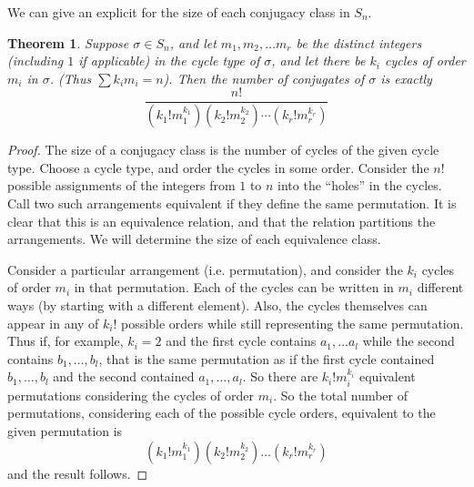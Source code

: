 \documentclass[12pt]{article}
\newtheorem{thm}{Theorem}
\theoremstyle{definition}
\begin{document}
We can give an explicit  for the size of each conjugacy class in $S_n$. 
\begin{thm}
Suppose $\sigma\in S_n$, and let $m_1,m_2,\ldots m_r$ be the \emph{distinct} integers (including $1$ if applicable) in the cycle type of $\sigma$, and let there be $k_i$ cycles of order $m_i$ in $\sigma$. (Thus $\sum k_i m_i=n$). Then the number of conjugates of $\sigma$ is exactly
\[\frac{n!}{(k_1!m_1^{k_1})(k_2!m_2^{k_2})\cdots(k_r!m_r^{k_r})}\]
\end{thm}
\begin{proof}
The size of a conjugacy class is the number of cycles of the given cycle type. Choose a cycle type, and order the cycles in some  order. Consider the $n!$ possible assignments of the integers from $1$ to $n$ into the "`holes"' in the cycles. Call two such arrangements equivalent if they define the same permutation. It is clear that this is an equivalence relation, and that the relation partitions the arrangements. We will determine the size of each equivalence class.

Consider a particular arrangement (i.e. permutation), and consider the $k_i$ cycles of order $m_i$ in that permutation. Each of the cycles can be written in $m_i$ different ways (by starting with a different element). Also, the cycles themselves can appear in any of $k_i!$ possible orders while still representing the same permutation. Thus if, for example, $k_i=2$ and the first cycle contains $a_1,\ldots a_l$ while the second contains $b_1,\ldots,b_l$, that is the same permutation as if the first cycle contained $b_1,\ldots,b_l$ and the second contained $a_1,\ldots,a_l$. So there are $k_i! m_i^{k_i}$ equivalent permutations considering the cycles of order $m_i$. So the total number of permutations, considering each of the possible cycle orders, equivalent to the given permutation is
\[(k_1! m_1^{k_1})(k_2! m_2^{k_2})\ldots (k_r! m_r^{k_r})\]
and the result follows.
\end{proof}
\end{document}
